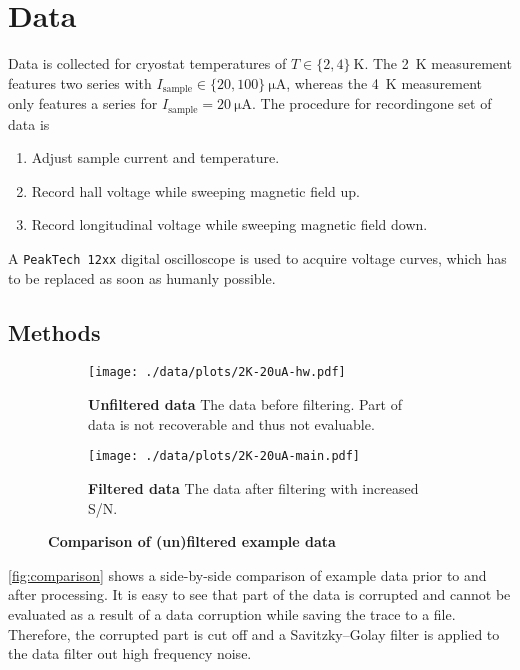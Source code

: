 \chapter{Data}
Data is collected for cryostat temperatures of $T\in\{ 2,4\}\ \si{\kelvin}$.
The \SI{2}{\kelvin} measurement features two series with $I_\text{sample}\in\{ 20,100\}\ \si{\micro\ampere}$, whereas the \SI{4}{\kelvin} measurement only features a series for $I_\text{sample}=\SI{20}{\micro\ampere}$.
The procedure for recordingone set of data is
\begin{enumerate}
	\item Adjust sample current and temperature.
	\item Record hall voltage while sweeping magnetic field up.
	\item Record longitudinal voltage while sweeping magnetic field down.
\end{enumerate}
A \texttt{PeakTech 12xx} digital oscilloscope is used to acquire voltage curves, which has to be replaced as soon as humanly possible.

\section{Methods} %
\begin{figure}
	\centering
	\begin{subfigure}{.48\textwidth}
		\centering
		\texttt{[image: ./data/plots/2K-20uA-hw.pdf]}
		\caption{\textbf{Unfiltered data} The data before filtering. Part of data is not recoverable and thus not evaluable.}
	\end{subfigure}
	\hspace*{\fill}
	\begin{subfigure}{.48\textwidth}
		\centering
		\texttt{[image: ./data/plots/2K-20uA-main.pdf]}
		\caption{\textbf{Filtered data} The data after filtering with increased S/N.}
	\end{subfigure}
	\caption[Comparison of (un)filtered example data]{\textbf{Comparison of (un)filtered example data}}
	\label{fig:comparison}
\end{figure}
\autoref{fig:comparison} shows a side-by-side comparison of example data prior to and after processing.
It is easy to see that part of the data is corrupted and cannot be evaluated as a result of a data corruption while saving the trace to a file.
Therefore, the corrupted part is cut off and a Savitzky–Golay filter is applied to the data filter out high frequency noise.

